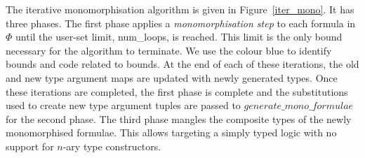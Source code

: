 \documentclass[runningheads]{llncs}
\begin{document}
The iterative monomorphisation algorithm is given in Figure~\ref{iter_mono}. It has three phases. The first phase applies a \emph{monomorphisation step} to each formula in \(\Phi\) until the user-set limit, \textcolor{ourblueviolet}{num\_loops}, is reached. This limit is the only bound necessary for the algorithm to terminate. We use the colour blue to identify bounds and code related to bounds. At the end of each of these iterations, the old and new type argument maps are updated with newly generated types. Once these iterations are completed, the first phase is complete and the substitutions used to create new type argument tuples are passed to $\mathit{generate\_mono\_formulae}$ for the second phase. The third phase mangles the composite types of the newly monomorphised formulae. This allows targeting a simply typed logic with no support for $n$-ary type constructors.
\end{document}
